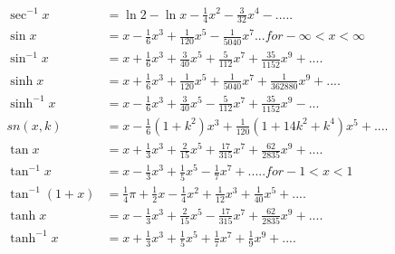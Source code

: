		\begin{align}
		\sec^{-1} x &= \ln 2 - \ln x - \frac{1}{4} x^2 - \frac{3}{32} x^4 - .....\\
		\sin x &= x - \frac{1}{6} x^3 + \frac{1}{120} x^5 - \frac{1}{5040} x^7 ... for - \infty < x < \infty \\
		\sin^{-1} x &= x + \frac{1}{6} x^3 + \frac{3}{40} x^5 + \frac{5}{112} x^7 + \frac{35}{1152} x^9 + ....\\
		\sinh x &= x + \frac{1}{6} x^3 + \frac{1}{120} x^5 + \frac{1}{5040} x^7 + \frac{1}{362880} x^9 + ....\\
		\sinh^{-1} x &= x - \frac{1}{6} x^3 + \frac{3}{40} x^5 - \frac{5}{112} x^7 + \frac{35}{1152} x^9 -  ... \\
		sn(x,k) &= x - \frac{1}{6}(1+k^2) x^3 + \frac{1}{120} (1 + 14k^2 + k^4) x^5 + .... \\
		\tan x &= x + \frac{1}{3} x^3 + \frac{2}{15} x^5 + \frac{17}{315} x^7 + \frac{62}{2835} x^9 + ....\\
		\tan^{-1} x &= x - \frac{1}{3} x^3 + \frac{1}{5} x^5 - \frac{1}{7} x^7 + ..... for -1 < x < 1 \\
		\tan^{-1}(1+x) &= \frac{1}{4} \pi + \frac{1}{2} x - \frac{1}{4} x^2 + \frac{1}{12} x ^3 + \frac{1}{40} x^5 + ....\\
		\tanh x &= x - \frac{1}{3} x^3 + \frac{2}{15} x^5 - \frac{17}{315} x^7 + \frac{62}{2835} x^9 + ....\\
		\tanh^{-1} x &= x + \frac{1}{3} x^3 + \frac{1}{5} x^5 + \frac{1}{7} x^7 + \frac{1}{9} x^{9} + ....\\
		\end{align}


